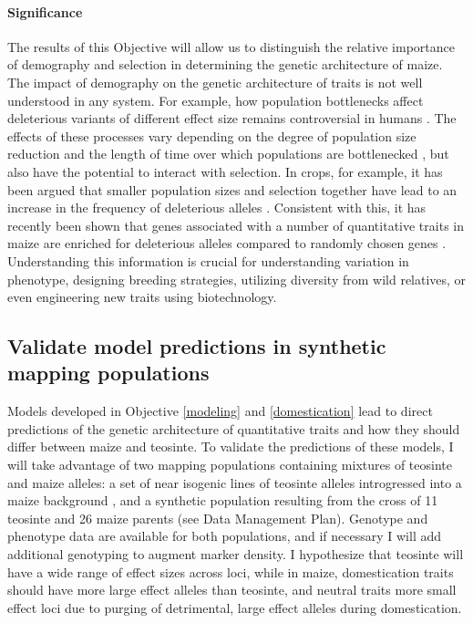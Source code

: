 \paragraph{Significance}
The results of this Objective will allow us to distinguish the relative importance of demography and selection in determining the genetic architecture of maize. 
The impact of demography on the genetic architecture of traits is not well understood in any system. For example, how population bottlenecks affect deleterious variants of different effect size remains controversial in humans \citep{Hancock:2011jb, Henn:2015ce, Henn:2015dp, Lohmueller:2014dn, Simons:2014fj}. The effects of these processes vary depending on the degree of population size reduction and the length of time over which populations are bottlenecked \citep[e.g.][]{Caplins:2014ke}, but also have the potential to interact with selection. In crops, for example, it has been argued that smaller population sizes and selection together have lead to an increase in the frequency of deleterious alleles  \citep{Gunther:2010, Renaut:2015hi}. Consistent with this, it has recently been shown that genes associated with a number of quantitative traits in maize are enriched for deleterious alleles compared to randomly chosen genes \citep{Mezmouk:2014jd}. Understanding this information is crucial for understanding variation in phenotype, designing breeding strategies, utilizing diversity from wild relatives, or even engineering new traits using biotechnology. 

\vspace{-1ex}
\subsection{Validate model predictions in synthetic mapping populations}\vspace{-1ex}
\label{validation}

Models developed in Objective \ref{modeling} and \ref{domestication} lead to direct predictions of the genetic architecture of quantitative traits and how they should differ between maize and teosinte. To validate the predictions of these models, I will take advantage of two mapping populations containing mixtures of teosinte and maize alleles: a set of near isogenic lines of teosinte alleles introgressed into a maize background \citep{Liu:InPress}, and a synthetic population resulting from the cross of 11 teosinte and 26 maize parents (see Data Management Plan). Genotype and phenotype data are available for both populations, and if necessary I will add additional genotyping to augment marker density. I hypothesize that teosinte will have a wide range of effect sizes across loci, while in maize, domestication traits should have more large effect alleles than teosinte, and neutral traits more small effect loci due to purging of detrimental, large effect alleles during domestication. 

